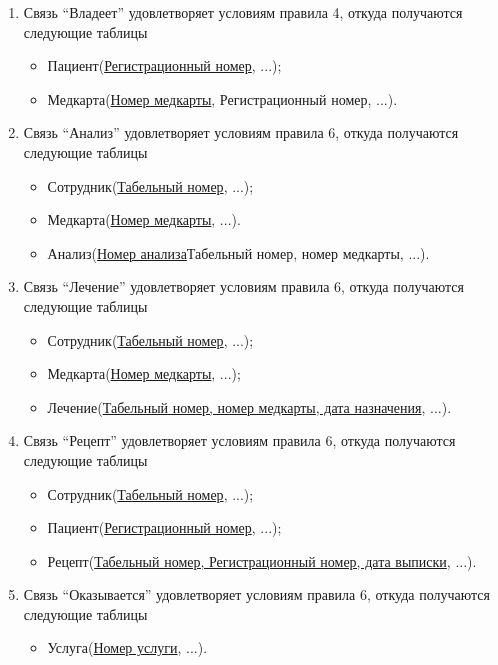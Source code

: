 \documentclass[14pt,a4paper,russian]{extreport}
\begin{document}
\begin{enumerate}
    \item Связь ``Владеет'' удовлетворяет условиям правила 4, откуда получаются следующие таблицы
        \begin{itemize}
            \item Пациент(\underline{Регистрационный номер}, ...);
            \item Медкарта(\underline{Номер медкарты}, Регистрационный номер, ...).
        \end{itemize}
    \item Связь ``Анализ'' удовлетворяет условиям правила 6, откуда получаются следующие
        таблицы
        \begin{itemize}
            \item Сотрудник(\underline{Табельный номер}, ...);
            \item Медкарта(\underline{Номер медкарты}, ...).
            \item Анализ(\underline{Номер анализа}Табельный номер, номер медкарты, ...).
        \end{itemize}
    \item Связь ``Лечение'' удовлетворяет условиям правила 6, откуда получаются следующие таблицы
        \begin{itemize}
            \item Сотрудник(\underline{Табельный номер}, ...);
            \item Медкарта(\underline{Номер медкарты}, ...);
            \item Лечение(\underline{Табельный номер, номер медкарты, дата назначения}, ...).
        \end{itemize}
    \item Связь ``Рецепт'' удовлетворяет условиям правила 6, откуда получаются следующие таблицы
        \begin{itemize}
            \item Сотрудник(\underline{Табельный номер}, ...);
            \item Пациент(\underline{Регистрационный номер}, ...);
            \item Рецепт(\underline{Табельный номер, Регистрационный номер, дата выписки}, ...).
        \end{itemize}
    \item Связь ``Оказывается'' удовлетворяет условиям правила 6, откуда получаются следующие
        таблицы
        \begin{itemize}
            \item Услуга(\underline{Номер услуги}, ...).

\end{itemize}
\end{enumerate}
\end{document}
